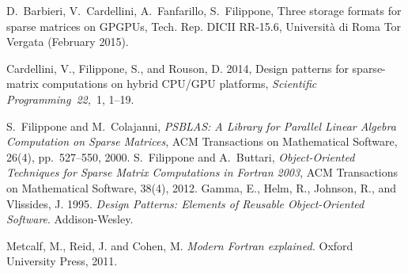 
\begin{thebibliography}{99}
D.~Barbieri, V.~Cardellini, A.~Fanfarillo, S.~Filippone, Three storage formats
  for sparse matrices on {GPGPUs}, Tech. Rep. DICII RR-15.6, Universit\`a di
  Roma Tor Vergata (February 2015).

{ Cardellini, V.}, { Filippone, S.}, { and} { Rouson, D.} 2014,
 Design patterns for sparse-matrix computations on hybrid {CPU/GPU}
  platforms,
{\em Scientific Programming\/}~{\em 22,\/}~1, 1--19.

S.~Filippone and M.~Colajanni, 
{\em PSBLAS: A Library for Parallel Linear Algebra
Computation on Sparse Matrices},
\newblock
ACM Transactions on Mathematical Software, 26(4), pp.~527--550, 2000.
%
S.~Filippone and A.~Buttari, 
{\em Object-Oriented Techniques for Sparse Matrix Computations in Fortran 2003},
\newblock
ACM Transactions on Mathematical Software, 38(4), 2012.
%
{ Gamma, E.}, { Helm, R.}, { Johnson, R.}, { and} { Vlissides,
  J.} 1995.
 {\em Design Patterns: Elements of Reusable Object-Oriented Software}.
 Addison-Wesley.

%
{Metcalf, M., Reid, J. and Cohen, M.}
{\em Modern Fortran  explained.}
{Oxford University Press}, 2011.
%
\end{thebibliography}
